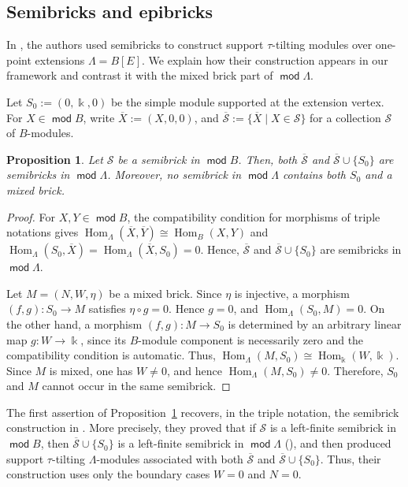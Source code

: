 \documentclass[a4,12pt]{amsart}
\numberwithin{equation}{section} %
\def\Hom{\operatorname{Hom}} %
\def\mod{\operatorname{\mathsf{mod}}}
\newtheorem{proposition}[theorem]{Proposition} %
\theoremstyle{definition} %
\begin{document}
\subsection{Semibricks and epibricks}
In \cite{GaoXie}, the authors used semibricks to construct support $\tau$-tilting modules over one-point extensions $\Lambda=B[E]$. We explain how their construction appears in our framework and contrast it with the mixed brick part of $\mod \Lambda$.

Let $S_0:=(0,\Bbbk,0)$ be the simple module supported at the extension vertex. For $X\in\mod B$, write $\overline X:=(X,0,0)$, and $\overline{\mathcal{S}}:=\{\overline X\mid X\in\mathcal{S}\}$ for a collection $\mathcal{S}$ of $B$-modules.

\begin{proposition}\label{prop:boundary-semibricks}
Let $\mathcal{S}$ be a semibrick in $\mod B$. Then, both $\overline{\mathcal{S}}$ and $\overline{\mathcal{S}}\cup\{S_0\}$ are semibricks in $\mod \Lambda$. Moreover, no semibrick in $\mod \Lambda$ contains both $S_0$ and a mixed brick.
\end{proposition}
\begin{proof}
For $X,Y\in\mod B$, the compatibility condition for morphisms of triple notations gives $\Hom_\Lambda(\overline X,\overline Y) \cong \Hom_B(X,Y)$ and $\Hom_\Lambda(S_0,\overline X) = \Hom_\Lambda(\overline X,S_0)=0$. Hence, $\overline{\mathcal{S}}$ and $\overline{\mathcal{S}}\cup\{S_0\}$ are semibricks in $\mod \Lambda$.

Let $M=(N,W,\eta)$ be a mixed brick. Since $\eta$ is injective, a morphism $(f,g)\colon S_0\rightarrow M$ satisfies $\eta \circ g=0$. Hence $g=0$, and $\Hom_\Lambda(S_0,M)=0$. On the other hand, a morphism $(f,g)\colon M\rightarrow S_0$ is determined by an arbitrary linear map $g\colon W\rightarrow\Bbbk$, since its $B$-module component is necessarily zero and the compatibility condition is automatic. Thus, $\Hom_\Lambda(M,S_0) \cong \Hom_{\Bbbk}(W,\Bbbk)$. Since $M$ is mixed, one has $W\neq0$, and hence $\Hom_\Lambda(M,S_0)\neq0$. Therefore, $S_0$ and $M$ cannot occur in the same semibrick.
\end{proof}

The first assertion of Proposition~\ref{prop:boundary-semibricks} recovers, in the triple notation, the semibrick construction in \cite[Proposition~1.1]{GaoXie}. More precisely, they
proved that if $\mathcal{S}$ is a left-finite semibrick in $\mod B$, then $\overline{\mathcal{S}}\cup\{S_0\}$ is a left-finite semibrick in $\mod \Lambda$ (\cite[Proposition~3.4]{GaoXie}), and then produced support $\tau$-tilting $\Lambda$-modules associated with both $\overline{\mathcal{S}}$ and $\overline{\mathcal{S}}\cup\{S_0\}$. Thus, their construction uses only the boundary cases $W=0$ and $N=0$.
\end{document}
